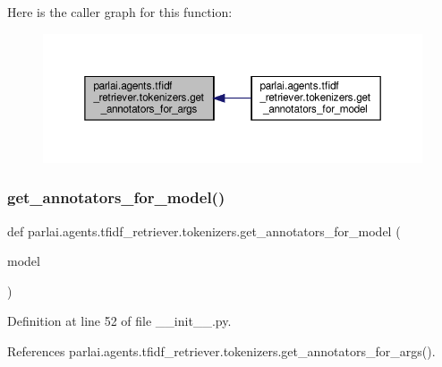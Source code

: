 Here is the caller graph for this function\+:
\nopagebreak
\begin{figure}[H]
\begin{center}
\leavevmode
\includegraphics[width=350pt]{namespaceparlai_1_1agents_1_1tfidf__retriever_1_1tokenizers_abbf344e2c42997de73bbe499f86cdba7_icgraph}
\end{center}
\end{figure}
\mbox{\label{namespaceparlai_1_1agents_1_1tfidf__retriever_1_1tokenizers_ab7667918dcbcaef77377c42adc16c2f6}} 
\subsubsection{\texorpdfstring{get\+\_\+annotators\+\_\+for\+\_\+model()}{get\_annotators\_for\_model()}}
{\footnotesize\ttfamily def parlai.\+agents.\+tfidf\+\_\+retriever.\+tokenizers.\+get\+\_\+annotators\+\_\+for\+\_\+model (\begin{DoxyParamCaption}\item[{}]{model }\end{DoxyParamCaption})}



Definition at line 52 of file \+\_\+\+\_\+init\+\_\+\+\_\+.\+py.



References parlai.\+agents.\+tfidf\+\_\+retriever.\+tokenizers.\+get\+\_\+annotators\+\_\+for\+\_\+args().

